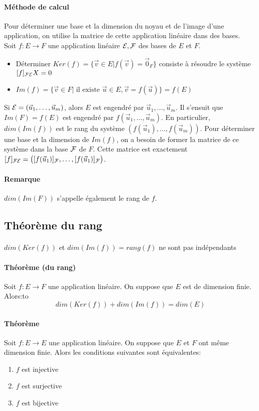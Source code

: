 \paragraph{Méthode de calcul} Pour déterminer une base et la dimension du noyau et de l'image d'une application, on utilise la matrice de cette application linéaire dans des bases. \\
Soit $f: E \rightarrow F$ une application linéaire $\mathcal{E}, \mathcal{F}$ des bases de $E$ et $F$.
\begin{itemize}
  \item Déterminer $Ker(f) = \{\vec{v} \in E \vert f(\vec{v}) = \vec{0}_F \}$ consiste à résoudre le système $[f]_{\mathcal{F} \mathcal{E}} X = 0$
  \item $Im(f) = \{ \vec{v} \in F \vert \text{ il existe } \vec{u} \in E, \vec{v} = f(\vec{u}) \} = f(E)$
\end{itemize}
Si $\mathcal{E} = (\vec{u}_1, \ldots, \vec{u}_m)$, alors $E$ est engendré par $\vec{u}_1, \ldots, \vec{u}_m$. Il s'ensuit que $Im(F) = f(E)$ est engendré par $f(\vec{u}_1, \ldots, \vec{u}_m)$. En particulier, $dim(Im(f))$ est le rang du système $(f(\vec{u}_1), \ldots, f(\vec{u}_m))$. Pour déterminer une base et la dimension de $Im(f)$, on a besoin de former la matrice de ce système dans la base $\mathcal{F}$ de $F$. Cette matrice est exactement $[f]_{\mathcal{F} \mathcal{E}} = \big([f(\vec{u}_1)]_{\mathcal{F}}, \ldots, [f(\vec{u}_1)]_{\mathcal{F}}\big)$.

\paragraph{Remarque} $dim(Im(F))$ s'appelle également le rang de $f$.

%
\subsection{Théorème du rang}
%
\paragraph{} $dim(Ker(f))$ et $dim(Im(f)) = rang(f)$ ne sont pas indépendants
\paragraph{Théorème (du rang)} Soit $f: E \rightarrow F$ une application linéaire. On suppose que $E$ est de dimension finie. Alors:to
$$dim(Ker(f)) + dim(Im(f)) = dim(E)$$

\paragraph{Théorème} Soit $f: E \rightarrow E$ une application linéaire. On suppose que $E$ et $F$ ont même dimension finie. Alors les conditions suivantes sont équivalentes:
\begin{enumerate}
  \item $f$ est injective 
  \item $f$ est surjective
  \item $f$ est bijective
\end{enumerate}

